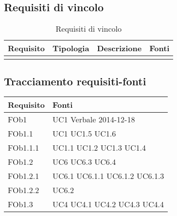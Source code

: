 \subsection{ Requisiti di vincolo}
	
\begin{longtable}{|l|p{2.5cm}|p{3.5cm}|l|}
\hline
\textbf{Requisito} & \textbf{Tipologia} & \textbf{Descrizione} & \textbf{Fonti} \\
\hline
\caption{Requisiti di vincolo}
\end{longtable}
\subsection{ Tracciamento requisiti-fonti}
	
\begin{longtable}{|l|l|}
\hline
\textbf{Requisito} & \textbf{Fonti} \\
\hline
FOb1 & UC1 \linebreak Verbale 2014-12-18 \linebreak \\ 
\hline
FOb1.1 & UC1 \linebreak  UC1.5 \linebreak  UC1.6 \linebreak  \\ 
\hline
FOb1.1.1 & UC1.1 \linebreak  UC1.2 \linebreak  UC1.3 \linebreak  UC1.4 \linebreak  \\ 
\hline
FOb1.2 & UC6 \linebreak  UC6.3 \linebreak  UC6.4 \linebreak  \\ 
\hline
FOb1.2.1 & UC6.1 \linebreak  UC6.1.1 \linebreak  UC6.1.2 \linebreak  UC6.1.3 \linebreak  \\ 
\hline
FOb1.2.2 & UC6.2 \linebreak  \\ 
\hline
FOb1.3 & UC4 \linebreak  UC4.1 \linebreak  UC4.2 \linebreak  UC4.3 \linebreak  UC4.4 \linebreak  \\ 

\end{longtable}
